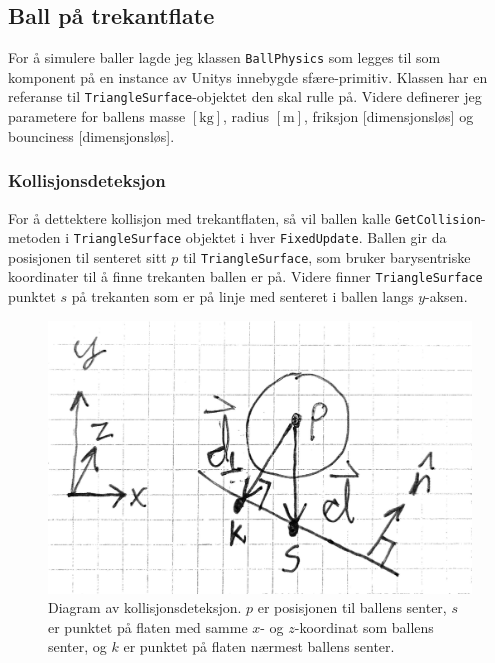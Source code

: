 \documentclass[norsk, doc, 12pt, a4paper]{apa7}  %
\begin{document}
\subsection{Ball på trekantflate}
For å simulere baller lagde jeg klassen \verb+BallPhysics+ som legges til som komponent på en instance av Unitys innebygde sfære-primitiv. Klassen har en referanse til \verb+TriangleSurface+-objektet den skal rulle på. Videre definerer jeg parametere for ballens masse \([\si{\kilogram}]\), radius \([\si{\metre}]\), friksjon [dimensjonsløs] og bounciness [dimensjonsløs].

\subsubsection{Kollisjonsdeteksjon} \label{sec:3:A}
For å dettektere kollisjon med trekantflaten, så vil ballen kalle \verb+GetCollision+-metoden i \verb+TriangleSurface+ objektet i hver \verb+FixedUpdate+. Ballen gir da posisjonen til senteret sitt \(p\) til \verb+TriangleSurface+, som bruker barysentriske koordinater til å finne trekanten ballen er på. Videre finner \verb+TriangleSurface+ punktet \(s\) på trekanten som er på linje med senteret i ballen langs \(y\)-aksen.

\begin{figure}[H]
	\centering
	\label{fig:kollisjon}
	\includegraphics[scale=0.25]{figs/kollisjon.pdf}
	\caption{Diagram av kollisjonsdeteksjon. \(p\) er posisjonen til ballens senter, \(s\) er punktet på flaten med samme \(x\)- og \(z\)-koordinat som ballens senter, og \(k\) er punktet på flaten nærmest ballens senter.}
\end{figure}
\end{document}
